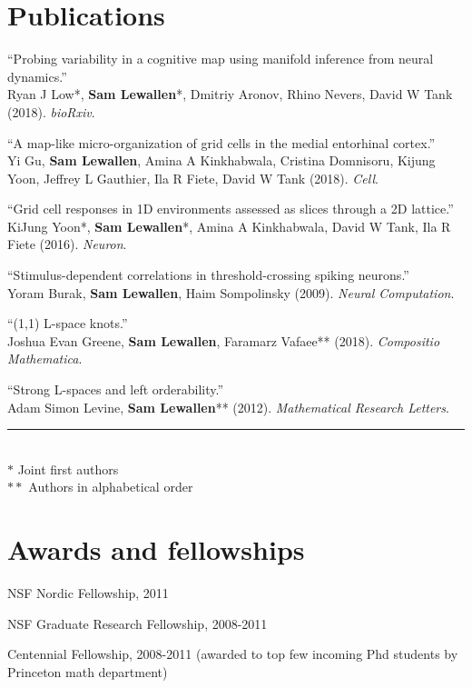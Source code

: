 \documentclass[letterpaper]{article}
\def\lsk{\\[.15em]}
\def\lskk{\\[-.9em]}
\renewenvironment{itemize}{
  \begin{list}{}{
    \setlength{\leftmargin}{1.5em}
  }
}{
  \end{list}
}
\begin{document}
\section*{Publications}
\begin{itemize}

\item ``Probing variability in a cognitive map using manifold inference from
neural dynamics.'' \lsk
Ryan J Low*, \textbf{Sam Lewallen}*, Dmitriy Aronov, Rhino Nevers, David W Tank
(2018). \emph{bioRxiv}.\lskk

\item ``A map-like micro-organization of grid cells in the medial entorhinal
cortex.'' \lsk
Yi Gu, \textbf{Sam Lewallen}, Amina A Kinkhabwala, Cristina Domnisoru, Kijung Yoon, Jeffrey L Gauthier, Ila R Fiete, David W Tank (2018). \emph{Cell}.\lskk

\item ``Grid cell responses in 1D environments assessed as slices through a 2D
lattice.'' \lsk
KiJung Yoon*, \textbf{Sam Lewallen}*, Amina A Kinkhabwala, David W Tank, Ila R
Fiete (2016). \emph{Neuron}.\lskk

\item ``Stimulus-dependent correlations in threshold-crossing spiking neurons.''  \lsk
Yoram Burak, \textbf{Sam Lewallen}, Haim Sompolinsky (2009). \emph{Neural
Computation}.\lskk

\item ``(1,1) L-space knots.'' \lsk
Joshua Evan Greene, \textbf{Sam Lewallen}, Faramarz Vafaee** (2018).
\emph{Compositio Mathematica}.\lskk

\item ``Strong L-spaces and left orderability.'' \lsk
Adam Simon Levine, \textbf{Sam Lewallen}** (2012). \emph{Mathematical Research
Letters}.\lsk
\rule{0.5\linewidth}{\linethickness} \lsk
$*$ Joint first authors \lsk
$**$ Authors in alphabetical order
\end{itemize}

\section*{Awards and fellowships}

\begin{itemize}
\item NSF Nordic Fellowship, 2011 
\item NSF Graduate Research Fellowship, 2008-2011 
\item Centennial Fellowship, 2008-2011 (awarded to top few incoming Phd students by Princeton math department) 
\end{itemize}
\end{document}
